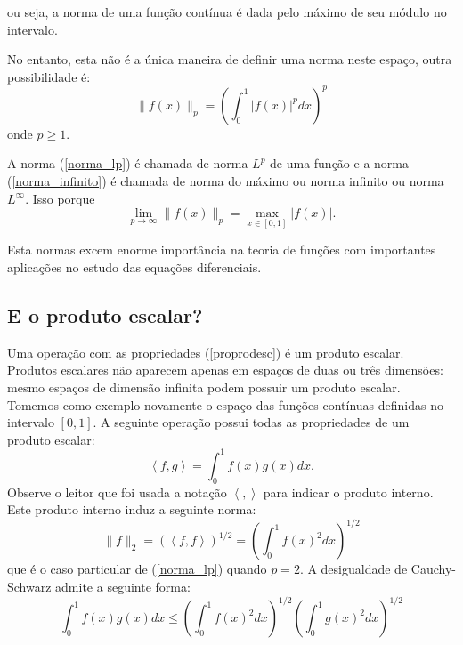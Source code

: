 ou seja, a norma de uma função contínua é dada pelo máximo de seu módulo no intervalo.

No entanto, esta não é a única maneira de definir uma norma neste espaço, outra possibilidade é:
\begin{equation}\label{norma_lp}\|f(x)\|_{p}=\left(\int_0^1|f(x)|^pdx\right)^p\end{equation}
onde $p\geq 1$.

A norma (\ref{norma_lp}) é chamada de norma $L^p$ de uma função e a norma (\ref{norma_infinito}) é chamada de norma do máximo ou norma infinito ou norma $L^{\infty}$. Isso porque
$$\lim_{p\to\infty}\|f(x)\|_{p}=\max_{x\in [0,1]}|f(x)|.$$

Esta normas excem enorme importância na teoria de funções com importantes aplicações no estudo das equações diferenciais. 

\subsection{E o produto escalar?}
Uma operação com as propriedades (\ref{proprodesc}) é um produto escalar. Produtos escalares não aparecem apenas em espaços de duas ou três dimensões: mesmo espaços de dimensão infinita podem possuir um produto escalar. Tomemos como exemplo novamente o espaço das funções contínuas definidas no intervalo $[0,1]$. A seguinte operação possui todas as propriedades de um produto escalar:
$$\left<f,g\right>=\int_0^1f(x)g(x)dx.$$
Observe o leitor que foi usada a notação $\left<,\right>$ para indicar o produto interno. Este produto interno induz a seguinte norma:
$$\|f\|_2=\left(\left<f,f\right>\right)^{1/2}=\left(\int_0^1f(x)^2dx\right)^{1/2}$$
que é o caso particular de (\ref{norma_lp}) quando $p=2$. 
 A desigualdade de Cauchy-Schwarz admite a seguinte forma:
$$\int_0^1f(x)g(x)dx \leq \left(\int_0^1f(x)^2dx\right)^{1/2} \left(\int_0^1g(x)^2dx\right)^{1/2}$$
 